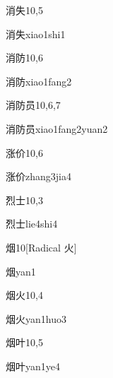 \begin{entry}{消失}{10,5}
  \begin{phonetics}{消失}{xiao1shi1}
  \end{phonetics}
\end{entry}

\begin{entry}{消防}{10,6}
  \begin{phonetics}{消防}{xiao1fang2}
  \end{phonetics}
\end{entry}

\begin{entry}{消防员}{10,6,7}
  \begin{phonetics}{消防员}{xiao1fang2yuan2}
  \end{phonetics}
\end{entry}

\begin{entry}{涨价}{10,6}
  \begin{phonetics}{涨价}{zhang3jia4}
  \end{phonetics}
\end{entry}

\begin{entry}{烈士}{10,3}
  \begin{phonetics}{烈士}{lie4shi4}
  \end{phonetics}
\end{entry}

\begin{entry}{烟}{10}[Radical 火]
  \begin{phonetics}{烟}{yan1}
  \end{phonetics}
\end{entry}

\begin{entry}{烟火}{10,4}
  \begin{phonetics}{烟火}{yan1huo3}
  \end{phonetics}
\end{entry}

\begin{entry}{烟叶}{10,5}
  \begin{phonetics}{烟叶}{yan1ye4}
  \end{phonetics}
\end{entry}

